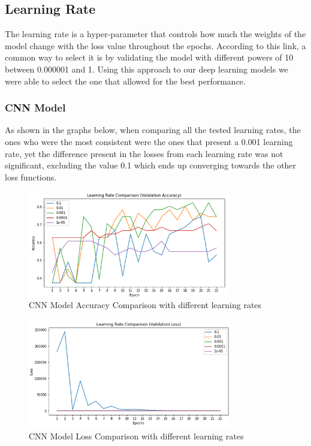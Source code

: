 \documentclass[conference]{IEEEtran}
\begin{document}
\subsection{Learning Rate}

The learning rate is a hyper-parameter that controls how much the weights of the model change with the loss value throughout the epochs. According to this link\cite{b1}, a common way to select it is by validating the model with different powers of 10 between 0.000001 and 1. Using this approach to our deep learning models we were able to select the one that allowed for the best performance.

\subsubsection{CNN Model}
As shown in the graphs below, when comparing all the tested learning rates, the ones who were the most consistent were the ones that present a 0.001 learning rate, yet the difference present in the losses from each learning rate was not significant, excluding the value 0.1 which ends up converging towards the other loss functions.
\begin{figure}[H]
    \centering
    \includegraphics[width=3.5in]{learning_rates_cnn.png}
    \caption{CNN Model Accuracy Comparison with different learning rates}\label{fig:fig18}
\end{figure}

\begin{figure}[H]
    \centering
    \includegraphics[width=3.5in]{loss_cnn.png}
    \caption{CNN Model Loss Comparison with different learning rates}\label{fig:fig19}
\end{figure}
\end{document}

